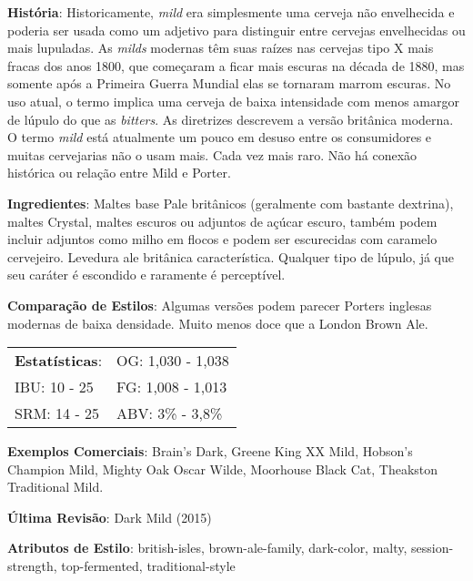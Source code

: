 \textbf{História}: Historicamente, \textit{mild} era simplesmente uma cerveja não envelhecida e poderia ser usada como um adjetivo para distinguir entre cervejas envelhecidas ou mais lupuladas. As \textit{milds} modernas têm suas raízes nas cervejas tipo X mais fracas dos anos 1800, que começaram a ficar mais escuras na década de 1880, mas somente após a Primeira Guerra Mundial elas se tornaram marrom escuras. No uso atual, o termo implica uma cerveja de baixa intensidade com menos amargor de lúpulo do que as \textit{bitters}. As diretrizes descrevem a versão britânica moderna. O termo \textit{mild} está atualmente um pouco em desuso entre os consumidores e muitas cervejarias não o usam mais. Cada vez mais raro. Não há conexão histórica ou relação entre Mild e Porter.

\textbf{Ingredientes}: Maltes base Pale britânicos (geralmente com bastante dextrina), maltes Crystal, maltes escuros ou adjuntos de açúcar escuro, também podem incluir adjuntos como milho em flocos e podem ser escurecidas com caramelo cervejeiro. Levedura ale britânica característica. Qualquer tipo de lúpulo, já que seu caráter é escondido e raramente é perceptível.

\textbf{Comparação de Estilos}: Algumas versões podem parecer Porters inglesas modernas de baixa densidade. Muito menos doce que a London Brown Ale.

\begin{tabular}{@{}p{35mm}p{35mm}@{}}
  \textbf{Estatísticas}: & OG: 1,030 - 1,038 \\
  IBU: 10 - 25  & FG: 1,008 - 1,013  \\
  SRM: 14 - 25  & ABV: 3\% - 3,8\%
\end{tabular}

\textbf{Exemplos Comerciais}: Brain's Dark, Greene King XX Mild, Hobson's Champion Mild, Mighty Oak Oscar Wilde, Moorhouse Black Cat, Theakston Traditional Mild.

\textbf{Última Revisão}: Dark Mild (2015)

\textbf{Atributos de Estilo}: british-isles, brown-ale-family, dark-color, malty, session-strength, top-fermented, traditional-style
